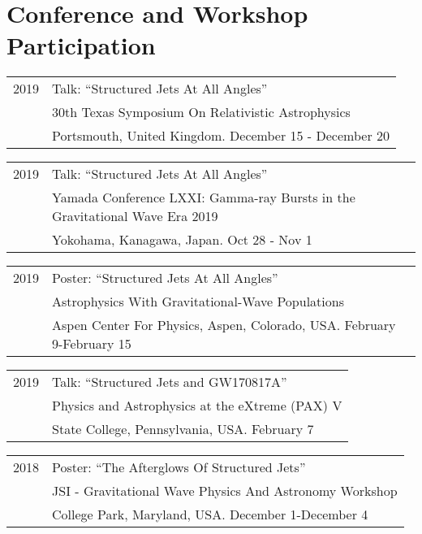 \documentclass[letterpaper]{article}
\renewenvironment{itemize}{
  \begin{list}{}{
    \setlength{\leftmargin}{1.5em}
  }
}{
  \end{list}
}
\begin{document}
\section*{Conference and Workshop Participation}
\begin{itemize}

\item \begin{tabular}{ll}
2019 & Talk: ``Structured Jets At All Angles'' \\
	 &  30th Texas Symposium On Relativistic Astrophysics \\
	 &  Portsmouth, United Kingdom. December 15 - December 20
\end{tabular}

\item \begin{tabular}{ll}
2019 & Talk: ``Structured Jets At All Angles'' \\
	 &  Yamada Conference LXXI: Gamma-ray Bursts in the Gravitational Wave Era 2019 \\
	 &  Yokohama, Kanagawa, Japan. Oct 28 - Nov 1
\end{tabular}

\item \begin{tabular}{ll}
2019 & Poster: ``Structured Jets At All Angles'' \\
	 &  Astrophysics With Gravitational-Wave Populations \\
	 &  Aspen Center For Physics, Aspen, Colorado, USA. February 9-February 15
\end{tabular}

\item \begin{tabular}{ll}
2019 & Talk: ``Structured Jets and GW170817A'' \\
	 & Physics and Astrophysics at the eXtreme (PAX) V \\
	 & State College, Pennsylvania, USA. February 7
\end{tabular}

\item \begin{tabular}{ll}
2018 & Poster: ``The Afterglows Of Structured Jets'' \\
	 & JSI - Gravitational Wave Physics And Astronomy Workshop \\
	 & College Park, Maryland, USA. December 1-December 4
\end{tabular}


\end{itemize}
\end{document}
